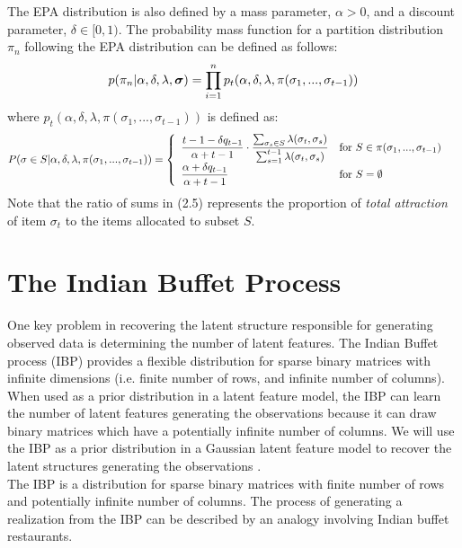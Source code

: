 \noindent
The EPA distribution is also defined by a mass parameter, $\alpha > 0$, and a
discount parameter, $\delta \in [0,1)$. The probability mass function for a
partition distribution $\pi_n$ following the EPA distribution can be defined as
follows:
\begin{equation}
  p(\pi_n|\alpha,\delta,\lambda,\bm\sigma)=
    \prod\limits_{i=1}^{n}p_t(\alpha,\delta,\lambda,\pi(\sigma_1,...,\sigma_{t-1}))
\end{equation}
where $p_t(\alpha,\delta,\lambda,\pi(\sigma_1,...,\sigma_{t-1}))$ is defined as:
\begin{equation}
  P(\sigma \in S | \alpha,\delta,\lambda,\pi(\sigma_1,...,\sigma_{t-1}))=
  \begin{cases}
    \begin{array}{ll}
      \displaystyle\frac{t-1-\delta q_{t-1}}{\alpha+t-1} \cdot 
        \frac{\sum_{\sigma_s \in S}\lambda(\sigma_t,\sigma_s)}
        {\sum_{s=1}^{t-1}\lambda(\sigma_t,\sigma_s)} & 
        \text{for }S \in \pi(\sigma_1,...,\sigma_{t-1})\\
      \displaystyle\frac{\alpha+\delta q_{t-1}}{\alpha+t-1} &  \text{for }S  = \emptyset \\
    \end{array}
  \end{cases}
\end{equation}
Note that the ratio of sums in (2.5) represents the proportion of \textit{total
attraction} of item $\sigma_t$ to the items allocated to subset $S$.


\section{The Indian Buffet Process}
One key problem in recovering the latent structure responsible for generating
observed data is determining the number of latent features. The Indian Buffet
process (IBP) provides a flexible distribution for sparse binary matrices with
infinite dimensions (i.e. finite number of rows, and infinite number of columns).
When used as a prior distribution in a latent feature model, the IBP can
learn the number of latent features generating the observations because it can
draw binary matrices which have a potentially infinite number of columns. We will
use the IBP as a prior distribution in a Gaussian latent feature model to
recover the latent structures generating the observations \citep{ibp}.\\

\noindent
The IBP is a distribution for sparse binary matrices with finite number of rows
and potentially infinite number of columns. The process of generating a
realization from the IBP can be described by an analogy involving Indian buffet
restaurants.\\

